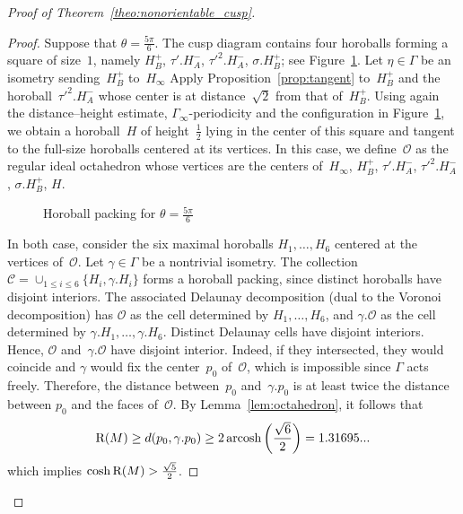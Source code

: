 \documentclass[11pt,reqno]{amsart}
\theoremstyle{definition}
\numberwithin{equation}{section}
\newcommand\RR{{\rm R}}
\DeclareMathOperator{\arcosh}{arcosh}
\numberwithin{equation}{section}
\begin{document}
\begin{proof}[Proof of Theorem~\ref{theo:nonorientable_cusp}]
\begin{proof}
Suppose that $\theta=\frac{5\pi}{6}$.
The cusp diagram contains four horoballs forming a square of size~$1$, namely $H_B^+$, $\tau'.H_A^-$, $\tau'^2.H_A^-$, $\sigma.H_B^+$; see Figure~\ref{fig:5pi/6}.
Let $\eta \in \Gamma$ be an isometry sending~$H_B^+$ to~$H_\infty$
Apply Proposition~\ref{prop:tangent} to~$H_B^+$ and the horoball~$\tau'^2.H_A^-$ whose center is at distance~$\sqrt{2}$ from that of~$H_B^+$.
Using again the distance--height estimate, $\Gamma_\infty$-periodicity and the configuration in Figure~\ref{fig:5pi/6}, we obtain a horoball~$H$ of height~$\frac{1}{2}$ lying in the center of this square and tangent to the full-size horoballs centered at its vertices.
In this case, we define~$\mathcal{O}$ as the regular ideal octahedron whose vertices are the centers of~$H_\infty$, $H_B^+$, $\tau'.H_A^-$, $\tau'^2.H_A^-$, $\sigma.H_B^+$, $H$.


\medskip

\begin{figure}[htbp!]
\centering
\vspace*{4.2cm}
\hspace*{-0.5cm}
\def\svgwidth{0.45\textheight}

\vspace*{0cm}
\caption{Horoball packing for $\theta=\frac{5\pi}{6}$} \label{fig:5pi/6}
\end{figure}


In both case, consider the six maximal horoballs $H_1,\dots,H_6$ centered at the vertices of~$\mathcal{O}$.
Let $\gamma \in \Gamma$ be a nontrivial isometry.
The collection $\mathcal{C}=\cup_{1 \leq i \leq 6} \{ H_i, \gamma.H_i \}$ forms a horoball packing, since distinct horoballs have disjoint interiors.
The associated Delaunay decomposition (dual to the Voronoi decomposition) has $\mathcal{O}$ as the cell determined by $H_1,\dots,H_6$, and $\gamma.\mathcal{O}$ as the cell determined by $\gamma.H_1, \dots, \gamma.H_6$.
Distinct Delaunay cells have disjoint interiors.
Hence, $\mathcal{O}$ and~$\gamma.\mathcal{O}$ have disjoint interior.
Indeed, if they intersected, they would coincide and $\gamma$ would fix the center~$p_0$ of~$\mathcal{O}$, which is impossible since $\Gamma$ acts freely.
Therefore, the distance between~$p_0$ and~$\gamma.p_0$ is at least twice the distance between $p_0$ and the faces of~$\mathcal{O}$.
By Lemma~\ref{lem:octahedron}, it follows that
\[
\RR(M) \geq d(p_0,\gamma.p_0) \geq 2 \arcosh \left( \frac{\sqrt{6}}{2} \right) = 1.31695...
\]
which implies $\cosh \RR(M) > \frac{\sqrt{5}}{2}$.
\end{proof}


\end{proof}
\end{document}
